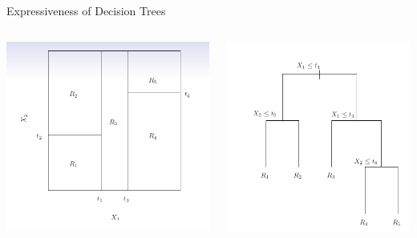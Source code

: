 \documentclass{beamer}
\begin{document}
\begin{frame}{Expressiveness of Decision Trees}
    \begin{columns}
            \centering
            \includegraphics[scale=0.40]{dTreeExpressiveness1.png}
            
            \centering
            \includegraphics[scale=0.40]{dTreeExpressiveness2.png}
    \end{columns}
\end{frame}
\end{document}
